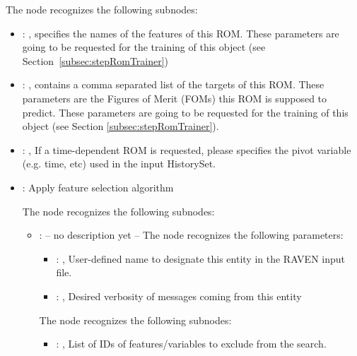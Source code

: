   The  node recognizes the following subnodes:
  \begin{itemize}
    \item {}: , 
      specifies the names of the features of this ROM.         \nb These parameters are going to be
      requested for the training of this object         (see Section~\ref{subsec:stepRomTrainer})

    \item {}: , 
      contains a comma separated list of the targets of this ROM. These parameters         are the
      Figures of Merit (FOMs) this ROM is supposed to predict.         \nb These parameters are
      going to be requested for the training of this         object (see Section
      \ref{subsec:stepRomTrainer}).

    \item {}: , 
      If a time-dependent ROM is requested, please specifies the pivot         variable (e.g. time,
      etc) used in the input HistorySet.

    \item {}:
      Apply feature selection algorithm

      The  node recognizes the following subnodes:
      \begin{itemize}
        \item {}:
          -- no description yet --
          The  node recognizes the following parameters:
            \begin{itemize}
              \item {}: , 
                User-defined name to designate this entity in the RAVEN input file.
              \item {}: , 
                Desired verbosity of messages coming from this entity
          \end{itemize}

          The  node recognizes the following subnodes:
          \begin{itemize}
            \item {}: , 
              List of IDs of features/variables to exclude from the search.


\end{itemize}
\end{itemize}
\end{itemize}
